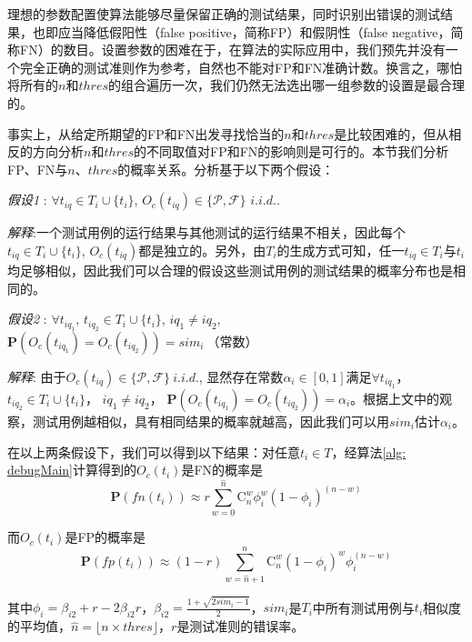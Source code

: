 理想的参数配置使算法能够尽量保留正确的测试结果，同时识别出错误的测试结果，也即应当降低假阳性（false positive，简称FP）和假阴性（false negative，简称FN）的数目。设置参数的困难在于，在算法的实际应用中，我们预先并没有一个完全正确的测试准则作为参考，自然也不能对FP和FN准确计数。换言之，哪怕将所有的$n$和$thres$的组合遍历一次，我们仍然无法选出哪一组参数的设置是最合理的。

事实上，从给定所期望的FP和FN出发寻找恰当的$n$和$thres$是比较困难的，但从相反的方向分析$n$和$thres$的不同取值对FP和FN的影响则是可行的。本节我们分析FP、FN与$n$、$thres$的概率关系。分析基于以下两个假设：

\textit{假设1} : $\forall t_{iq}\in T_i \cup \{t_i\}$, $O_c(t_{iq}) \in \{\mathcal{P}, \mathcal{F}\}$  $i.i.d.$.

\textit{解释}:一个测试用例的运行结果与其他测试的运行结果不相关，因此每个$t_{iq}\in T_i \cup \{t_i\}$, $O_c(t_{iq})$都是独立的。另外，由$T_i$的生成方式可知，任一$t_{iq}\in T_i$与$t_i$均足够相似，因此我们可以合理的假设这些测试用例的测试结果的概率分布也是相同的。

\textit{假设2} : $\forall t_{iq_1}$, $t_{iq_2} \in T_i \cup \{t_i\}$, $iq_1 \ne iq_2$,
$\mathbf{P}(O_c(t_{iq_1}) = O_c(t_{iq_2})) = {sim}_i\  （常数）$

\textit{解释}: 由于$O_c(t_{iq}) \in \{\mathcal{P}, \mathcal{F}\}\ i.i.d.$, 显然存在常数$\alpha_i \in [0,1]$满足$\forall t_{iq_1}$， $t_{iq_2} \in T_i \cup \{t_i\}$， $iq_1 \ne iq_2$， $\mathbf{P}(O_c(t_{iq_1}) = O_c(t_{iq_2})) = \alpha_i$。根据上文中的观察，测试用例越相似，具有相同结果的概率就越高，因此我们可以用${sim}_i$估计$\alpha_i$。

在以上两条假设下，我们可以得到以下结果：对任意$t_i \in T$，经算法\ref{alg: debugMain}计算得到的$O_c(t_i)$是FN的概率是	
\begin{equation}
\label{equ: fn single}
\mathbf{P}(fn(t_i))	\approx r \sum_{w = 0}^{\hat{n}}{\mathrm{C}_n^w{\phi_i^w (1-\phi_i)^{(n-w)}}}
\end{equation}

而$O_c(t_i)$是FP的概率是
\begin{equation}
\label{equ: fp single}
\mathbf{P}(fp(t_i)) \approx (1 - r) \sum_{w = \hat{n} + 1}^{n} \mathrm{C}_n^w{(1 - \phi_i)^w} \phi_i^{(n-w)}
\end{equation}

其中$\phi_i = \beta_{i2} + r - 2 \beta_{i2} r$，$\beta_{i2} = \frac{1 + \sqrt{2 sim_i - 1}}{2}$，$sim_i$是$T_i$中所有测试用例与$t_i$相似度的平均值，$\hat{n} = \lfloor n \times thres \rfloor$，$r$是测试准则的错误率。

